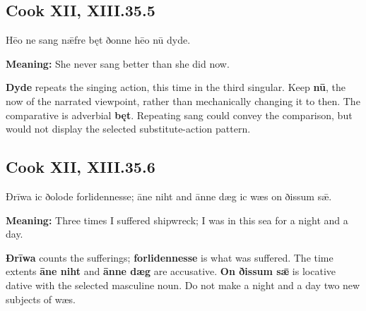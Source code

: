 \par\begin{minipage}{\linewidth}\raggedright
\subsection*{Cook XII, XIII.35.5}

Hēo ne sang nǣfre bęt ðonne hēo nū dyde.

\textbf{Meaning:} She never sang better than she did now.

\textbf{Dyde} repeats the singing action, this time in the third singular. Keep \textbf{nū}, the now of the narrated viewpoint, rather than mechanically changing it to then. The comparative is adverbial \textbf{bęt}. Repeating sang could convey the comparison, but would not display the selected substitute-action pattern.

\end{minipage}\par\addvspace{4pt}

\par\begin{minipage}{\linewidth}\raggedright
\subsection*{Cook XII, XIII.35.6}

Ðrīwa ic ðolode forlidennesse; āne niht and ānne dæg ic wæs on ðissum sǣ.

\textbf{Meaning:} Three times I suffered shipwreck; I was in this sea for a night and a day.

\textbf{Ðrīwa} counts the sufferings; \textbf{forlidennesse} is what was suffered. The time extents \textbf{āne niht} and \textbf{ānne dæg} are accusative. \textbf{On ðissum sǣ} is locative dative with the selected masculine noun. Do not make a night and a day two new subjects of wæs.

\end{minipage}\par\addvspace{4pt}

